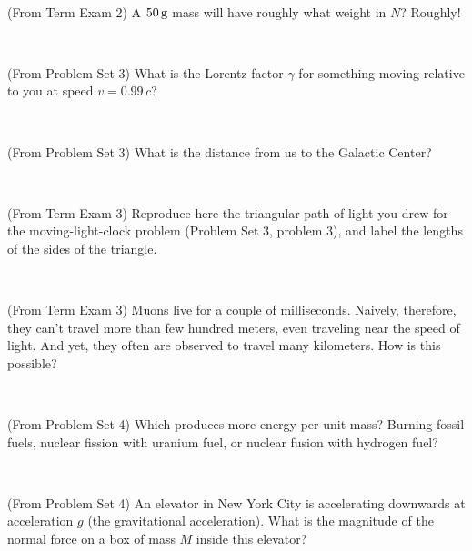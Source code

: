 \documentclass[12pt, letterpaper]{article}
\begin{document}
\vfill ~

\begin{problem}
  (From Term Exam 2)
  A $50\,\mathrm{g}$ mass will have roughly what weight in $N$? Roughly!
\end{problem}

\vfill ~

\clearpage

\begin{problem}
  (From Problem Set 3)
  What is the Lorentz factor $\gamma$ for something moving relative
  to you at speed $v = 0.99\,c$?
\end{problem}

\vfill ~

\begin{problem}
  (From Problem Set 3)
  What is the distance from us to the Galactic Center?
\end{problem}

\vfill ~

\begin{problem}
  (From Term Exam 3)
  Reproduce here the triangular path of light you drew for the moving-light-clock problem (Problem Set 3, problem 3), and label the lengths
of the sides of the triangle.
\end{problem}

\vfill ~

\begin{problem}
  (From Term Exam 3)
  Muons live for a couple of milliseconds. Naively, therefore, they can't travel more than few hundred meters,
even traveling near the speed of light. And yet, they often are observed to travel many kilometers.
How is this possible?
\end{problem}

\vfill ~

\clearpage

\begin{problem}
  (From Problem Set 4)
  Which produces more energy per unit mass?
  Burning fossil fuels,
  nuclear fission with uranium fuel, or
  nuclear fusion with hydrogen fuel?
\end{problem}

\vfill ~

\begin{problem}
  (From Problem Set 4)
  An elevator in New York City is accelerating downwards
  at acceleration $g$ (the gravitational acceleration).
  What is the magnitude of the normal force on a box of mass $M$ inside this elevator?
\end{problem}
\end{document}
